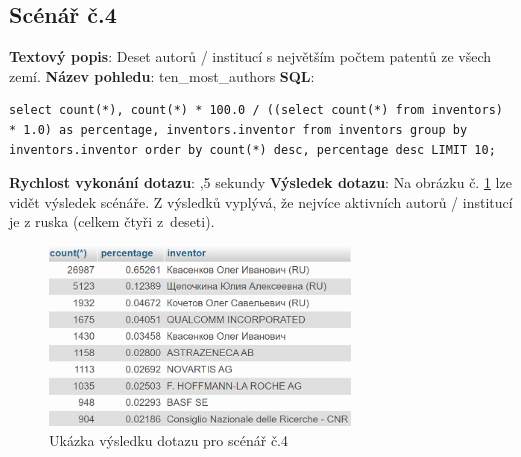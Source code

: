 \newpage
\subsection{Scénář č.4} 
\textbf{Textový popis}: Deset autorů / institucí s největším počtem patentů ze všech zemí.
\newline
\textbf{Název pohledu}: ten\_most\_authors
\newline
\textbf{SQL}: 
\begin{lstlisting}[label = {lst:elements_a}]
select count(*), count(*) * 100.0 / ((select count(*) from inventors) * 1.0) as percentage, inventors.inventor from inventors group by inventors.inventor order by count(*) desc, percentage desc LIMIT 10;
\end{lstlisting}
\textbf{Rychlost vykonání dotazu}: ,5 sekundy
\newline
\textbf{Výsledek dotazu}: Na obrázku č. \ref{fig:scenar4} lze vidět výsledek scénáře. Z výsledků vyplývá, že nejvíce aktivních autorů / institucí je z ruska (celkem čtyři z~deseti). 
\begin{figure}[H]
\centering
\includegraphics[width=8cm]{img/scenare/scenar_4}
\caption{Ukázka výsledku dotazu pro scénář č.4}
\label{fig:scenar4}
\end{figure}

\newpage
